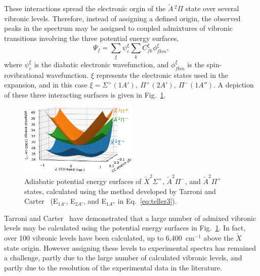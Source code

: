 \documentclass[journal=jpcafh,manuscript=article,layout=onecolumn, 12pt]{achemso}
\begin{document}
These interactions spread the electronic orgin of the $\tilde{A}\,^2\Pi$ state over several vibronic levels. Therefore, instead of assigning a defined origin, the observed peaks in the spectrum may be assigned to coupled admixtures of vibronic transitions involving the three potential energy surfaces,
\begin{equation}
\Psi_f = \sum_\xi \psi_e^\xi \sum_k C_{fk}^\xi\phi_{fkm}^\xi,
\label{eq:teller3} 
\end{equation}
where $\psi_e^\xi$ is the diabatic electronic wavefunction, and $\phi_{fkm}^\xi$ is the spin-rovibrational wavefunction. $\xi$ represents the electronic states used in the expansion, and in this case $\xi=\Sigma^+(1A'),~\Pi^+(2A'),~\Pi^-(1A'')$. A depiction of these three interacting surfaces is given in Fig.~\ref{fig:3}.

\begin{figure}
	\centering
	\includegraphics[width=0.5\textwidth]{figures/Fig3}
	\caption{Adiabatic potential energy surfaces of $\tilde{X}^2\Sigma^+$, $\tilde{A}^2\Pi^-$, and $\tilde{A}^2\Pi^+$ states, calculated using the method developed by Tarroni and Carter~\cite{tar03} (E$_{1A'}$, E$_{2A'}$, and E$_{1A''}$ in Eq.~\ref{eq:teller3}).}
	\label{fig:3}
\end{figure}

Tarroni and Carter~\cite{tar03} have demonstrated that a large number of admixed vibronic levels may be calculated using the potential energy surfaces in Fig.~\ref{fig:3}. In fact, over 100 vibronic levels have been calculated, up to 6,400~cm$^{-1}$ above the $\tilde{X}$ state origin. However assigning these levels to experimental spectra has remained a challenge, partly due to the large number of calculated vibronic levels, and partly due to the resolution of the experimental data in the literature. 

\end{document}
